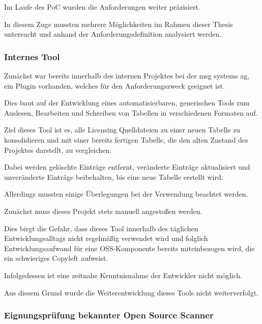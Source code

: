 Im Laufe des PoC wurden die Anforderungen weiter präzisiert.

In diesem Zuge mussten mehrere Möglichkeiten im Rahmen dieser Thesis untersucht und anhand der Anforderungsdefinition analysiert werden.

\subsubsection{Internes Tool}

Zunächst war bereits innerhalb des internen Projektes bei der msg systems ag, ein Plugin vorhanden, welches für den Anforderungszweck geeignet ist. 

Dies baut auf der Entwicklung eines automatisierbaren, generischen Tools zum Auslesen, Bearbeiten und Schreiben von Tabellen in verschiedenen Formaten auf. 

Ziel dieses Tool ist es, alle Licensing Quelldateien zu einer neuen Tabelle zu konsolidieren und mit einer bereits fertigen Tabelle, die den alten Zustand des Projektes darstellt, zu vergleichen. 

Dabei werden gelöschte Einträge entfernt, veränderte Einträge aktualisiert und unveränderte Einträge beibehalten, bis eine neue Tabelle erstellt wird.

Allerdings mussten einige Überlegungen bei der Verwendung beachtet werden. 

Zunächst muss dieses Projekt stets manuell angestoßen werden. 

Dies birgt die Gefahr, dass dieses Tool innerhalb des täglichen Entwicklungsalltags nicht regelmäßig verwendet wird und folglich Entwicklungsaufwand für eine OSS-Komponente bereits miteinbezogen wird, die ein schwieriges Copyleft aufweist. 

Infolgedessen ist eine zeitnahe Kenntnisnahme der Entwickler nicht möglich. 

Aus diesem Grund wurde die Weiterentwicklung dieses Tools nicht weiterverfolgt. 

\subsubsection{Eignungsprüfung bekannter Open Source Scanner}


